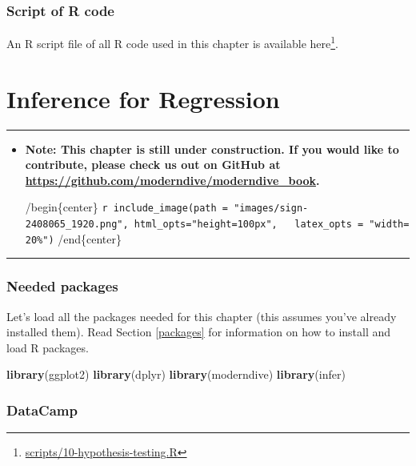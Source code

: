 \documentclass[12pt,]{krantz}
\makeatletter
\newenvironment{Shaded}{\begin{snugshade}}{\end{snugshade}}
\newcommand{\KeywordTok}[1]{\textcolor[rgb]{0.27,0.27,0.27}{\textbf{#1}}}
\newcommand{\NormalTok}[1]{#1}
\renewcommand{\href}[2]{#2\footnote{\url{#1}}}
\newenvironment{kframe}{%
\medskip{}
\setlength{\fboxsep}{.8em}
 \def\at@end@of@kframe{}%
 \ifinner\ifhmode%
  \def\at@end@of@kframe{\end{minipage}}%
  \begin{minipage}{\columnwidth}%
 \fi\fi%
 \def\FrameCommand##1{\hskip\@totalleftmargin \hskip-\fboxsep
 \colorbox{shadecolor}{##1}\hskip-\fboxsep
     \hskip-\linewidth \hskip-\@totalleftmargin \hskip\columnwidth}%
 \MakeFramed {\advance\hsize-\width
   \@totalleftmargin\z@ \linewidth\hsize
   \@setminipage}}%
 {\par\unskip\endMakeFramed%
 \at@end@of@kframe}
\renewenvironment{Shaded}{\begin{kframe}}{\end{kframe}}
\newenvironment{rmdblock}[1]
  {\begin{shaded*}
  \begin{itemize}
  \renewcommand{\labelitemi}{
    \raisebox{-.7\height}[0pt][0pt]{
    }
  }
  \item
  }
  {
  \end{itemize}
  \end{shaded*}
  }
\newenvironment{learncheck}
  {\begin{rmdblock}{warning}}
  {\end{rmdblock}}
\makeatother
\begin{document}
\subsection{Script of R code}\label{script-of-r-code-7}

An R script file of all R code used in this chapter is available
\href{scripts/10-hypothesis-testing.R}{here}.

\chapter{Inference for Regression}\label{inference-for-regression}

\begin{center}\rule{0.5\linewidth}{\linethickness}\end{center}

\begin{learncheck}
\textbf{Note: This chapter is still under construction. If you would
like to contribute, please check us out on GitHub at
\url{https://github.com/moderndive/moderndive_book}.}

/begin\{center\}
\texttt{r\ include\_image(path\ =\ "images/sign-2408065\_1920.png",\ html\_opts="height=100px",\ \ \ latex\_opts\ =\ "width=20\%")}
/end\{center\}
\end{learncheck}

\begin{center}\rule{0.5\linewidth}{\linethickness}\end{center}

\subsection*{Needed packages}\label{needed-packages-8}


Let's load all the packages needed for this chapter (this assumes you've
already installed them). Read Section \ref{packages} for information on
how to install and load R packages.

\begin{Shaded}
\begin{Highlighting}[]
\KeywordTok{library}\NormalTok{(ggplot2)}
\KeywordTok{library}\NormalTok{(dplyr)}
\KeywordTok{library}\NormalTok{(moderndive)}
\KeywordTok{library}\NormalTok{(infer)}
\end{Highlighting}
\end{Shaded}

\subsection*{DataCamp}\label{datacamp-7}
\end{document}
